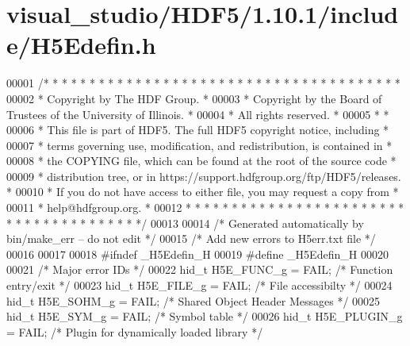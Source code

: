 \hypertarget{visual__studio_2_h_d_f5_21_810_81_2include_2_h5_edefin_8h_source}{}\section{visual\+\_\+studio/\+H\+D\+F5/1.10.1/include/\+H5\+Edefin.h}
\label{visual__studio_2_h_d_f5_21_810_81_2include_2_h5_edefin_8h_source}

\begin{DoxyCode}
00001 \textcolor{comment}{/* * * * * * * * * * * * * * * * * * * * * * * * * * * * * * * * * * * * * * *}
00002 \textcolor{comment}{ * Copyright by The HDF Group.                                               *}
00003 \textcolor{comment}{ * Copyright by the Board of Trustees of the University of Illinois.         *}
00004 \textcolor{comment}{ * All rights reserved.                                                      *}
00005 \textcolor{comment}{ *                                                                           *}
00006 \textcolor{comment}{ * This file is part of HDF5.  The full HDF5 copyright notice, including     *}
00007 \textcolor{comment}{ * terms governing use, modification, and redistribution, is contained in    *}
00008 \textcolor{comment}{ * the COPYING file, which can be found at the root of the source code       *}
00009 \textcolor{comment}{ * distribution tree, or in https://support.hdfgroup.org/ftp/HDF5/releases.  *}
00010 \textcolor{comment}{ * If you do not have access to either file, you may request a copy from     *}
00011 \textcolor{comment}{ * help@hdfgroup.org.                                                        *}
00012 \textcolor{comment}{ * * * * * * * * * * * * * * * * * * * * * * * * * * * * * * * * * * * * * * */}
00013 
00014 \textcolor{comment}{/* Generated automatically by bin/make\_err -- do not edit */}
00015 \textcolor{comment}{/* Add new errors to H5err.txt file */}
00016 
00017 
00018 \textcolor{preprocessor}{#ifndef \_H5Edefin\_H}
00019 \textcolor{preprocessor}{#define \_H5Edefin\_H}
00020 
00021 \textcolor{comment}{/* Major error IDs */}
00022 hid\_t H5E\_FUNC\_g           = FAIL;      \textcolor{comment}{/* Function entry/exit */}
00023 hid\_t H5E\_FILE\_g           = FAIL;      \textcolor{comment}{/* File accessibilty */}
00024 hid\_t H5E\_SOHM\_g           = FAIL;      \textcolor{comment}{/* Shared Object Header Messages */}
00025 hid\_t H5E\_SYM\_g            = FAIL;      \textcolor{comment}{/* Symbol table */}
00026 hid\_t H5E\_PLUGIN\_g         = FAIL;      \textcolor{comment}{/* Plugin for dynamically loaded library */}

\end{DoxyCode}
